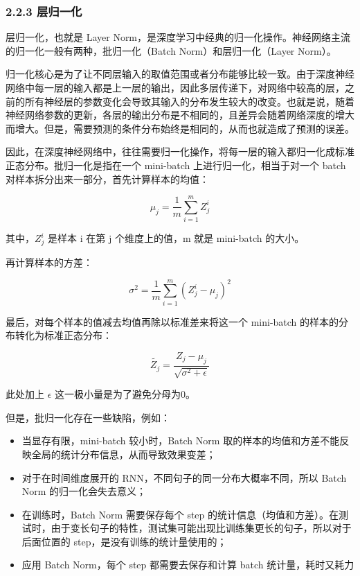 \documentclass[
]{article}
\providecommand{\tightlist}{%
  \setlength{\itemsep}{0pt}\setlength{\parskip}{0pt}}
\begin{document}
\subsubsection{2.2.3 层归一化}\label{ux5c42ux5f52ux4e00ux5316}

层归一化，也就是 Layer
Norm，是深度学习中经典的归一化操作。神经网络主流的归一化一般有两种，批归一化（Batch
Norm）和层归一化（Layer Norm）。

归一化核心是为了让不同层输入的取值范围或者分布能够比较一致。由于深度神经网络中每一层的输入都是上一层的输出，因此多层传递下，对网络中较高的层，之前的所有神经层的参数变化会导致其输入的分布发生较大的改变。也就是说，随着神经网络参数的更新，各层的输出分布是不相同的，且差异会随着网络深度的增大而增大。但是，需要预测的条件分布始终是相同的，从而也就造成了预测的误差。

因此，在深度神经网络中，往往需要归一化操作，将每一层的输入都归一化成标准正态分布。批归一化是指在一个
mini-batch 上进行归一化，相当于对一个 batch
对样本拆分出来一部分，首先计算样本的均值：

\[
\mu_j = \frac{1}{m}\sum^{m}_{i=1}Z_j^{i}
\]

其中，\(Z_j^{i}\) 是样本 i 在第 j 个维度上的值，m 就是 mini-batch
的大小。

再计算样本的方差：

\[
\sigma^2 = \frac{1}{m}\sum^{m}_{i=1}(Z_j^i - \mu_j)^2
\]

最后，对每个样本的值减去均值再除以标准差来将这一个 mini-batch
的样本的分布转化为标准正态分布：

\[
\widetilde{Z_j} = \frac{Z_j - \mu_j}{\sqrt{\sigma^2 + \epsilon}}
\]

此处加上 \(\epsilon\) 这一极小量是为了避免分母为0。

但是，批归一化存在一些缺陷，例如：

\begin{itemize}
\tightlist
\item
  当显存有限，mini-batch 较小时，Batch Norm
  取的样本的均值和方差不能反映全局的统计分布信息，从而导致效果变差；
\item
  对于在时间维度展开的 RNN，不同句子的同一分布大概率不同，所以 Batch
  Norm 的归一化会失去意义；
\item
  在训练时，Batch Norm 需要保存每个 step
  的统计信息（均值和方差）。在测试时，由于变长句子的特性，测试集可能出现比训练集更长的句子，所以对于后面位置的
  step，是没有训练的统计量使用的；
\item
  应用 Batch Norm，每个 step 都需要去保存和计算 batch 统计量，耗时又耗力
\end{itemize}
\end{document}
